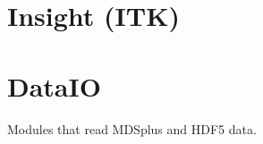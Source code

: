 \section{Insight (ITK)}
\label{sec:insightpackage}

\begin{description}
  
  
\end{description}


\section{DataIO}
\label{sec:dataiopackage}

\begin{description}
 Modules that read MDSplus and HDF5 data.
\end{description}

